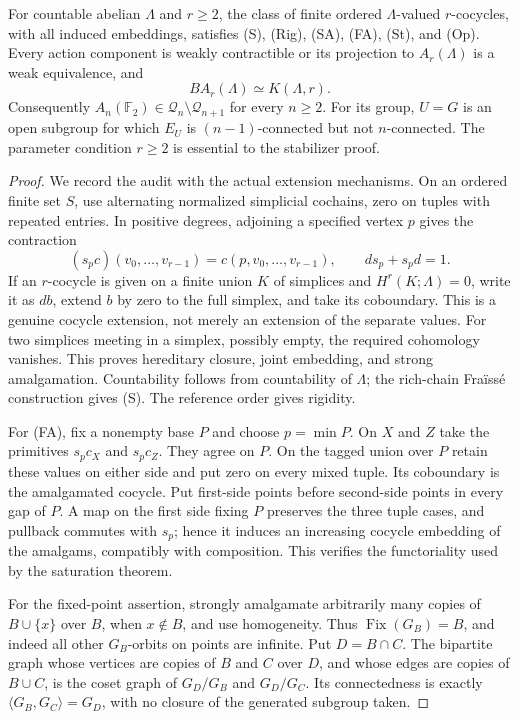 \begin{proposition}
\label{B:cocycle-audit}
For countable abelian $\Lambda$ and $r\geq2$, the class of finite
ordered $\Lambda$-valued $r$-cocycles, with all induced embeddings,
satisfies (S), (Rig), (SA), (FA), (St), and (Op).
Every action component is weakly contractible or its projection
to $A_r(\Lambda)$ is a weak equivalence, and
\[
 BA_r(\Lambda)\simeq K(\Lambda,r).
\]
Consequently
$A_n(\mathbb F_2)\in\mathcal Q_n\setminus\mathcal Q_{n+1}$
for every $n\geq2$. For its group, $U=G$ is an open subgroup for
which $E_U$ is $(n-1)$-connected but not $n$-connected.
The parameter condition $r\geq2$ is essential to the stabilizer
proof.
\end{proposition}
\begin{proof}
We record the audit with the actual extension mechanisms. On an
ordered finite set $S$, use alternating normalized simplicial
cochains, zero on tuples with repeated entries. In positive
degrees, adjoining a specified vertex $p$ gives the contraction
\[
 (s_pc)(v_0,\ldots,v_{r-1})=c(p,v_0,\ldots,v_{r-1}),
 \qquad ds_p+s_pd=1.
\]
If an $r$-cocycle is given on a finite union $K$ of simplices and
$H^r(K;\Lambda)=0$, write it as $db$, extend $b$ by zero to the
full simplex, and take its coboundary. This is a genuine cocycle
extension, not merely an extension of the separate values.
For two simplices meeting in a simplex, possibly empty, the
required cohomology vanishes. This proves hereditary closure,
joint embedding, and strong amalgamation. Countability follows
from countability of $\Lambda$; the rich-chain Fra\"iss\'e
construction gives (S). The reference order gives rigidity.

For (FA), fix a nonempty base $P$ and choose $p=\min P$.
On $X$ and $Z$ take the primitives $s_pc_X$ and $s_pc_Z$.
They agree on $P$. On the tagged union over $P$ retain these
values on either side and put zero on every mixed tuple.
Its coboundary is the amalgamated cocycle. Put first-side points
before second-side points in every gap of $P$. A map on the
first side fixing $P$ preserves the three tuple cases, and
pullback commutes with $s_p$; hence it induces an increasing
cocycle embedding of the amalgams, compatibly with composition.
This verifies the functoriality used by the saturation theorem.

For the fixed-point assertion, strongly amalgamate arbitrarily
many copies of $B\cup\{x\}$ over $B$, when $x\notin B$, and use
homogeneity. Thus $\operatorname{Fix}(G_B)=B$, and indeed all
other $G_B$-orbits on points are infinite. Put $D=B\cap C$.
The bipartite graph whose vertices are copies of $B$ and $C$
over $D$, and whose edges are copies of $B\cup C$, is the coset
graph of $G_D/G_B$ and $G_D/G_C$. Its connectedness is exactly
$\langle G_B,G_C\rangle=G_D$, with no closure of the generated
subgroup taken.


\end{proof}
